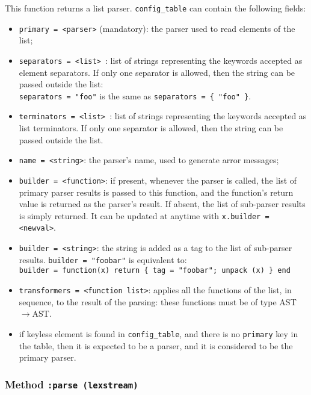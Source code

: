 This function returns a list parser. \verb|config_table| can contain
the following fields:
\begin{itemize}

\item\verb|primary = <parser>| (mandatory): the parser used to read
  elements of the list;

\item\verb|separators = <list> |: list of strings representing the
  keywords accepted as element separators. If only one separator is
  allowed, then the string can be passed outside the list:\\
  \verb|separators = "foo"| is the same as 
  \verb|separators = { "foo" }|.

\item\verb|terminators = <list> |: list of strings representing the
  keywords accepted as list terminators. If only one separator is
  allowed, then the string can be passed outside the list.

\item\verb|name = <string>|: the parser's name, used to generate arror
  messages;

\item\verb|builder = <function>|: if present, whenever the parser is
  called, the list of primary parser results is passed to this
  function, and the function's return value is returned as the
  parser's result. If absent, the list of sub-parser results is simply
  returned. It can be updated at anytime with
  \verb|x.builder = <newval>|.

\item\verb|builder = <string>|: the string is added as a tag to the
  list of sub-parser results. \verb|builder = "foobar"| is equivalent
  to:\\
 \verb|builder = function(x) return { tag = "foobar"; unpack (x) } end|

\item\verb|transformers = <function list>|: applies all the functions
  of the list, in sequence, to the result of the parsing: these
  functions must be of type AST$\rightarrow$AST.

\item if keyless element is found in \verb|config_table|, and there is
  no \verb|primary| key in the table, then it is expected to be a
  parser, and it is considered to be the primary parser.
\end{itemize}

\subsubsection{Method {\tt :parse (lexstream)}}

